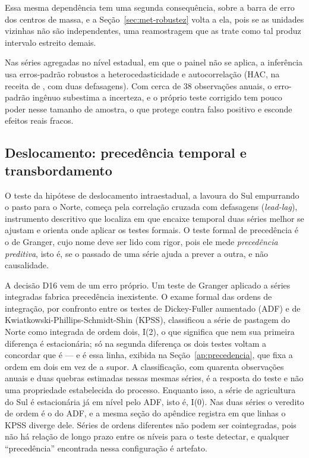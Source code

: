 Essa mesma dependência tem uma segunda consequência, sobre a barra de erro dos
centros de massa, e a Seção~\ref{sec:met-robustez} volta a ela, pois se as unidades
vizinhas não são independentes, uma reamostragem que as trate como tal produz
intervalo estreito demais.

Nas séries agregadas no nível estadual, em que o painel não se aplica, a
inferência usa erros-padrão robustos a heterocedasticidade e autocorrelação
(HAC, na receita de , com duas defasagens). Com
cerca de 38 observações anuais, o erro-padrão ingênuo subestima a incerteza, e
o próprio teste corrigido tem pouco poder nesse tamanho de amostra, o que
protege contra falso positivo e esconde efeitos reais fracos.

\subsection{Deslocamento: precedência temporal e transbordamento}

O teste da hipótese de deslocamento intraestadual, a lavoura do Sul
empurrando o pasto para o Norte, começa pela correlação cruzada com defasagens
(\emph{lead-lag}), instrumento descritivo que localiza em que encaixe temporal
duas séries melhor se ajustam e orienta onde aplicar os testes formais. O
teste formal de precedência é o de Granger, cujo nome deve ser lido com rigor, pois
ele mede \emph{precedência preditiva}, isto é, se o passado de uma série ajuda
a prever a outra, e não causalidade.

A decisão D16 vem de um erro próprio. Um teste de Granger aplicado a séries
integradas fabrica precedência inexistente. O exame formal das ordens de
integração, por confronto entre os testes de Dickey-Fuller aumentado (ADF)
e de Kwiatkowski-Phillips-Schmidt-Shin (KPSS), classificou a série de pastagem
do Norte como integrada de ordem dois, I(2), o que significa que nem sua primeira
diferença é estacionária; só na segunda diferença os dois testes voltam a
concordar que é --- e é essa linha, exibida na Seção~\ref{ap:precedencia}, que
fixa a ordem em dois em vez de a supor. A classificação, com quarenta
observações anuais e duas quebras estimadas nessas mesmas séries, é a resposta
do teste e não uma propriedade estabelecida do processo. Enquanto isso, a série
de agricultura do Sul é estacionária já em nível pelo ADF, isto é, I(0). Nas
duas séries o veredito de ordem é o do ADF, e a mesma seção do apêndice
registra em que linhas o KPSS diverge dele.
Séries de ordens diferentes não podem ser cointegradas, pois não há relação de
longo prazo entre os níveis para o teste detectar, e qualquer ``precedência''
encontrada nessa configuração é artefato.

